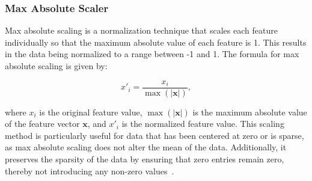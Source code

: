 \subsubsection{Max Absolute Scaler}
Max absolute scaling is a normalization technique that scales each feature individually so that the maximum absolute value of each feature is 1.
This results in the data being normalized to a range between -1 and 1.
The formula for max absolute scaling is given by:

$$
x'_i = \frac{x_i}{\max(|\mathbf{x}|)},
$$

where $x_i$ is the original feature value, $\max(|\mathbf{x}|)$ is the maximum absolute value of the feature vector $\mathbf{x}$, and $x'_i$ is the normalized feature value.
This scaling method is particularly useful for data that has been centered at zero or is sparse, as max absolute scaling does not alter the mean of the data.
Additionally, it preserves the sparsity of the data by ensuring that zero entries remain zero, thereby not introducing any non-zero values~\cite{Vasques2024}.